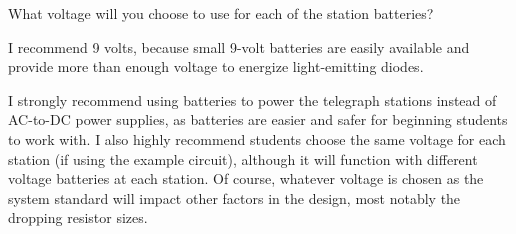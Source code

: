 

What voltage will you choose to use for each of the station batteries?







I recommend 9 volts, because small 9-volt batteries are easily available and provide more than enough voltage to energize light-emitting diodes.







I strongly recommend using batteries to power the telegraph stations instead of AC-to-DC power supplies, as batteries are easier and safer for beginning students to work with.  I also highly recommend students choose the same voltage for each station (if using the example circuit), although it will function with different voltage batteries at each station.  Of course, whatever voltage is chosen as the system standard will impact other factors in the design, most notably the dropping resistor sizes.



